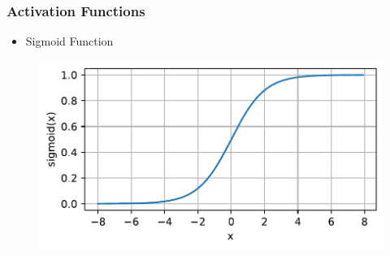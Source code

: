 \documentclass[
  shownotes,
  xcolor={svgnames},
  hyperref={colorlinks,citecolor=DarkBlue,linkcolor=DarkRed,urlcolor=DarkBlue}
  , aspectratio=169]{beamer}
\begin{document}
\begin{frame}
\frametitle{Activation Functions}




\begin{itemize}

\item Sigmoid Function

\end{itemize}

  \begin{figure}[H] \centering
            \captionsetup{justification=centering}
              \includegraphics[scale=0.45]{figures/sigmoid}
              
 \end{figure}

\end{frame}
\end{document}
